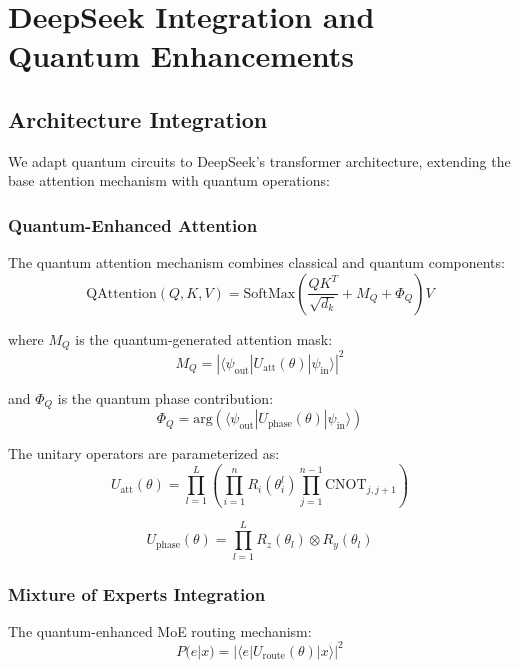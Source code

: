 \documentclass{article}
\begin{document}
\section{DeepSeek Integration and Quantum Enhancements}

\subsection{Architecture Integration}
We adapt quantum circuits to DeepSeek's transformer architecture, extending the base attention mechanism with quantum operations:

\subsubsection{Quantum-Enhanced Attention}
The quantum attention mechanism combines classical and quantum components:
\begin{equation}
\text{QAttention}(Q,K,V) = \text{SoftMax}\left(\frac{QK^T}{\sqrt{d_k}} + M_Q + \Phi_Q\right)V
\end{equation}

where $M_Q$ is the quantum-generated attention mask:
\begin{equation}
M_Q = |\langle\psi_{\text{out}}|U_{\text{att}}(\theta)|\psi_{\text{in}}\rangle|^2
\end{equation}

and $\Phi_Q$ is the quantum phase contribution:
\begin{equation}
\Phi_Q = \text{arg}\left(\langle\psi_{\text{out}}|U_{\text{phase}}(\theta)|\psi_{\text{in}}\rangle\right)
\end{equation}

The unitary operators are parameterized as:
\begin{equation}
U_{\text{att}}(\theta) = \prod_{l=1}^L \left(\prod_{i=1}^n R_i(\theta_i^l) \prod_{j=1}^{n-1} \text{CNOT}_{j,j+1}\right)
\end{equation}

\begin{equation}
U_{\text{phase}}(\theta) = \prod_{l=1}^L R_z(\theta_l) \otimes R_y(\theta_l)
\end{equation}

\subsubsection{Mixture of Experts Integration}
The quantum-enhanced MoE routing mechanism:
\begin{equation}
P(e|x) = |\langle e|U_{\text{route}}(\theta)|x\rangle|^2
\end{equation}
\end{document}

